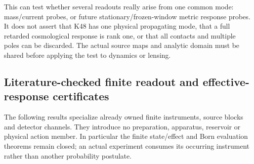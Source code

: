 \documentclass[12pt,a4paper]{article}
\begin{document}
This can test whether several readouts really arise from one common mode:
mass/current probes, or future stationary/frozen-window metric response
probes. It does not assert that K48 has one physical propagating mode,
that a full retarded cosmological response is rank one, or that all contacts
and multiple poles can be discarded. The actual source maps and analytic
domain must be shared before applying the test to dynamics or lensing.






\subsection{Literature-checked finite readout and effective-response certificates}
\label{p4:sec:v2210-lit-quantum-certificates}
The following results specialize already owned finite instruments, source
blocks and detector channels. They introduce no preparation, apparatus,
reservoir or physical action member. In particular the finite state/effect
and Born evaluation theorems remain closed; an actual experiment consumes
its occurring instrument rather than another probability postulate.
\end{document}
